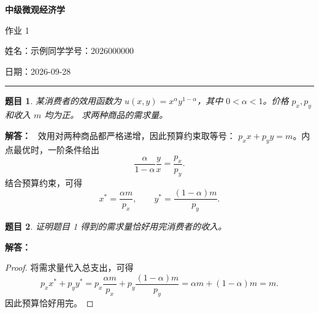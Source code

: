 \documentclass[11pt,a4paper]{ctexart}
\newcommand{\studentname}{示例同学}
\newcommand{\studentid}{2026000000}
\newcommand{\coursename}{中级微观经济学}
\newcommand{\assignmentnumber}{1}
\newcommand{\assignmentdate}{2026-09-28}
\newtheorem{problem}{题目}
\newenvironment{solution}
  {\par\noindent\textbf{解答：}\ }
  {\par\medskip}
\begin{document}
\begin{center}
  {\Large\bfseries \coursename}\par\medskip
  作业 \assignmentnumber\par\medskip
  姓名：\studentname\quad 学号：\studentid\par
  日期：\assignmentdate
\end{center}
\hrule
\bigskip

\begin{problem}
某消费者的效用函数为 $u(x,y)=x^{\alpha}y^{1-\alpha}$，其中
$0<\alpha<1$。价格 $p_x,p_y$ 和收入 $m$ 均为正。
求两种商品的需求量。
\end{problem}

\begin{solution}
效用对两种商品都严格递增，因此预算约束取等号：
$p_xx+p_yy=m$。内点最优时，一阶条件给出
\[
  \frac{\alpha}{1-\alpha}\frac{y}{x}=\frac{p_x}{p_y}.
\]
结合预算约束，可得
\[
  x^*=\frac{\alpha m}{p_x},
  \qquad
  y^*=\frac{(1-\alpha)m}{p_y}.
\]
\end{solution}

\begin{problem}
证明题目 1 得到的需求量恰好用完消费者的收入。
\end{problem}

\begin{solution}
\begin{proof}
将需求量代入总支出，可得
\[
  p_xx^*+p_yy^*
  =p_x\frac{\alpha m}{p_x}
   +p_y\frac{(1-\alpha)m}{p_y}
  =\alpha m+(1-\alpha)m=m.
\]
因此预算恰好用完。
\end{proof}
\end{solution}
\end{document}
